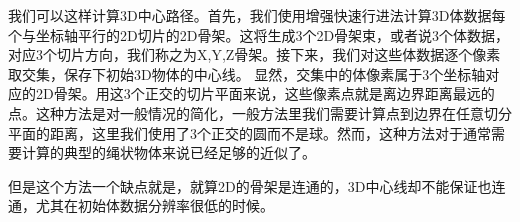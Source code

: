 我们可以这样计算3D中心路径。首先，我们使用增强快速行进法计算3D体数据每个与坐标轴平行的2D切片的2D骨架。这将生成3个2D骨架束，或者说3个体数据，对应3个切片方向，我们称之为X,Y,Z骨架。接下来，我们对这些体数据逐个像素取交集，保存下初始3D物体的中心线。
显然，交集中的体像素属于3个坐标轴对应的2D骨架。用这3个正交的切片平面来说，这些像素点就是离边界距离最远的点。这种方法是对一般情况的简化，一般方法里我们需要计算点到边界在任意切分平面的距离，这里我们使用了3个正交的圆而不是球。然而，这种方法对于通常需要计算的典型的绳状物体来说已经足够的近似了。

但是这个方法一个缺点就是，就算2D的骨架是连通的，3D中心线却不能保证也连通，尤其在初始体数据分辨率很低的时候。
